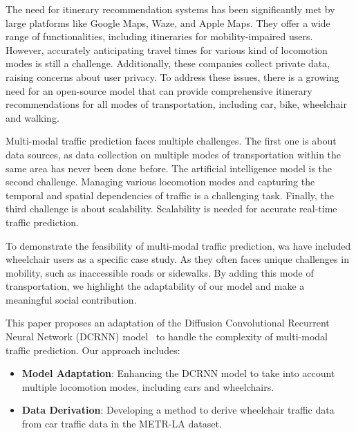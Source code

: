 The need for itinerary recommendation systems has been significantly met by large platforms like Google Maps, Waze, and Apple Maps.
They offer a wide range of functionalities, including itineraries for mobility-impaired users.
However, accurately anticipating travel times for various kind of locomotion modes is still a challenge.
Additionally, these companies collect private data, raising concerns about user privacy.
To address these issues, there is a growing need for an open-source model that can provide comprehensive itinerary
    recommendations for all modes of transportation, including car, bike, wheelchair and walking.
\vspace{1em}

Multi-modal traffic prediction faces multiple challenges.
The first one is about data sources, as data collection on multiple modes of transportation within the same area has never been done before.
The artificial intelligence model is the second challenge.
Managing various locomotion modes and capturing the temporal and spatial dependencies of traffic is a challenging task.
Finally, the third challenge is about scalability.
Scalability is needed for accurate real-time traffic prediction.
\vspace{1em}

To demonstrate the feasibility of multi-modal traffic prediction, wa have included wheelchair users as a specific case study.
As they often faces unique challenges in mobility, such as inaccessible roads or sidewalks.
By adding this mode of transportation, we highlight the adaptability of our model and make a meaningful social contribution.
\vspace{1em}

This paper proposes an adaptation of the Diffusion Convolutional Recurrent Neural Network (DCRNN) model~\cite{DCRNN} to handle the complexity of multi-modal traffic prediction.
Our approach includes:
\begin{itemize}
    \item \textbf{Model Adaptation}:
    Enhancing the DCRNN model to take into account multiple locomotion modes, including cars and wheelchairs.
    \item \textbf{Data Derivation}:
    Developing a method to derive wheelchair traffic data from car traffic data in the METR-LA dataset.
\end{itemize}
